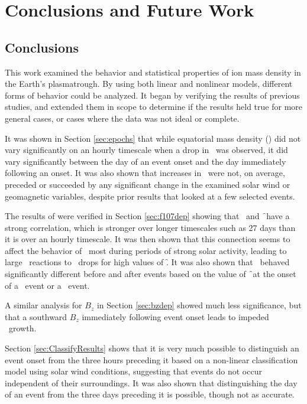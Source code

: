 \chapter[Conclusions and Future Work]{Conclusions and Future Work}

\section{Conclusions}
This work examined the behavior and statistical properties of ion mass density in the Earth's plasmatrough. By using both linear and nonlinear models, different forms of behavior could be analyzed. It began by verifying the results of previous studies, and extended them in scope to determine if the results held true for more general cases, or cases where the data was not ideal or complete. 

It was shown in Section \ref{sec:epochs} that while equatorial mass density (\req) did not vary significantly on an hourly timescale when a drop in \dst\ was observed, it did vary significantly between the day of an event onset and the day immediately following an onset. It was also shown that increases in \req\ were not, on average, preceded or succeeded by any significant change in the examined solar wind or geomagnetic variables, despite prior results that looked at a few selected events. 

The results of \cite{Takahashi2010SolarCycleVariation} were verified in Section \ref{sec:f107dep} showing that \req\ and \f\ have a strong correlation, which is stronger over longer timescales such as 27 days than it is over an hourly timescale. It was then shown that this connection seems to affect the behavior of \req\ most during periods of strong solar activity, leading to large \req\ reactions to \dst\ drops for high values of \f.  It was also shown that \req\ behaved significantly different before and after events based on the value of \f\ at the onset of a \req\ event or a \dst\ event.  

A similar analysis for $B_z$ in Section \ref{sec:bzdep} showed much less significance, but that a southward $B_z$ immediately following event onset leads to impeded \req\ growth.

Section \ref{sec:ClassifyResults} shows that it is very much possible to distinguish an event onset from the three hours preceding it based on a non-linear classification model using solar wind conditions, suggesting that events do not occur independent of their surroundings. It was also shown that distinguishing the day of an event from the three days preceding it is possible, though not as accurate.

